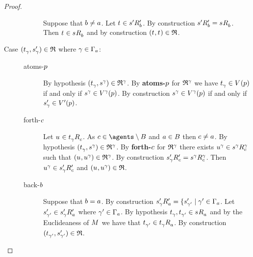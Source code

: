 \begin{proof}
\begin{description}
\begin{description}
                Suppose that $\agentB \neq \agentA$.
                Let $\kStateT \in \kSuccessorsPB{\kStateSP}$.
                By construction $\kSuccessorsPB{\kStateSP} = \kSuccessorsB{\kStateS}$.
                Then $\kStateT \in \kSuccessorsB{\kStateS}$ and by construction $(\kStateT, \kStateT) \in \refinement$.
        \end{description}
    \item[Case $(\kStateT_\gamma, \kStateSP_\gamma) \in \refinement$ where $\gamma \in \Gamma_\agentA$:]
        \hfill
        \begin{description}
            \item[atoms-$\atomP$] 
                By hypothesis $(\kStateT_\gamma, \kStateS[\gamma]) \in \refinement^\gamma$.
                By {\bf atoms-$\atomP$} for $\refinement^\gamma$ we have $\kStateT_\gamma \in \kValuation(\atomP)$ if and only if $\kStateS[\gamma] \in \kValuation[\gamma](\atomP)$.
                By construction $\kStateS[\gamma] \in \kValuation[\gamma](\atomP)$ if and only if $\kStateSP_\gamma \in \kValuationP(\atomP)$.
            \item[forth-$\agentC$]
                Let $\kStateU \in \kSuccessorsC{\kStateT_\gamma}$.
                As $\agentC \in \agents \setminus \agentsB$ and $\agentA \in \agentsB$ then $\agentC \neq \agentA$.
                By hypothesis $(\kStateT_\gamma, \kStateS[\gamma]) \in \refinement^\gamma$.
                By {\bf forth-$\agentC$} for $\refinement^\gamma$ there exists $\kStateU[\gamma] \in \kSuccessorsC[\gamma]{\kStateS[\gamma]}$ such that $(\kStateU, \kStateU[\gamma]) \in \refinement^\gamma$.
                By construction $\kSuccessorsPC{\kStateSP_\gamma} = \kSuccessorsC[\gamma]{\kStateS[\gamma]}$.
                Then $\kStateU[\gamma] \in \kSuccessorsPC{\kStateSP_\gamma}$ and $(\kStateU, \kStateU[\gamma]) \in \refinement$.
            \item[back-$\agentB$]
                Suppose that $\agentB = \agentA$.
                By construction $\kSuccessorsPA{\kStateSP_\gamma} = \{\kStateSP_{\gamma'} \mid \gamma' \in \Gamma_\agentA$.
                Let $\kStateSP_{\gamma'} \in \kSuccessorsPA{\kStateSP_\gamma}$ where $\gamma' \in \Gamma_\agentA$.
                By hypothesis $\kStateT_{\gamma}, \kStateT_{\gamma'} \in \kSuccessorsA{\kStateS}$ and by the Euclideaness of $\kModel$ we have that $\kStateT_{\gamma'} \in \kSuccessorsA{\kStateT_\gamma}$.
                By construction $(\kStateT_{\gamma'}, \kStateSP_{\gamma'}) \in \refinement$.


\end{description}
\end{description}
\end{proof}
